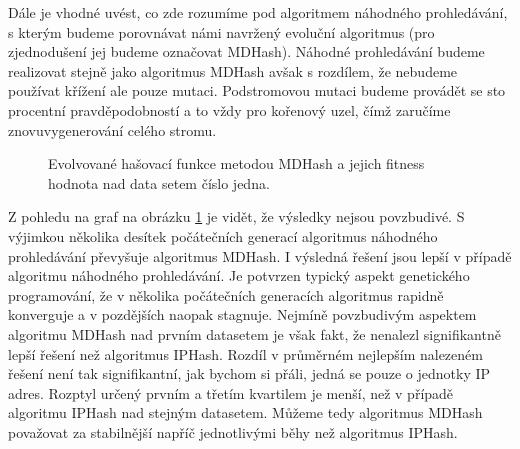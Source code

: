 Dále je vhodné uvést, co zde rozumíme pod algoritmem náhodného prohledávání, s kterým budeme porovnávat námi navržený
evoluční algoritmus (pro zjednodušení jej budeme označovat MDHash). Náhodné prohledávání budeme realizovat stejně jako
algoritmus MDHash avšak s rozdílem, že nebudeme používat křížení ale pouze mutaci. Podstromovou mutaci budeme provádět
se sto procentní pravděpodobností a to vždy pro kořenový uzel, čímž zaručíme znovuvygenerování celého stromu. 

\begin{figure}[!ht]
	\centering
	\caption{Evolvované hašovací funkce metodou MDHash a jejich fitness hodnota nad data setem číslo jedna.}
	\label{fig:MDComparison1}
\end{figure}

Z pohledu na graf na obrázku \ref{fig:MDComparison1} je vidět, že výsledky nejsou povzbudivé. S výjimkou několika desítek počátečních
generací algoritmus náhodného prohledávání
převyšuje algoritmus MDHash. I výsledná řešení jsou lepší v případě algoritmu náhodného prohledávání. Je potvrzen typický aspekt genetického
programování, že v několika počátečních generacích algoritmus rapidně konverguje a v pozdějších naopak stagnuje. Nejmíně povzbudivým aspektem
algoritmu MDHash nad prvním datasetem je však fakt, že nenalezl signifikantně lepší řešení než algoritmus IPHash. Rozdíl v průměrném nejlepším
nalezeném řešení není tak signifikantní, jak bychom si přáli, jedná se pouze o jednotky IP adres. Rozptyl určený prvním a třetím kvartilem je menší,
než v případě algoritmu IPHash nad stejným datasetem. Můžeme tedy algoritmus MDHash považovat za stabilnější napříč jednotlivými běhy než
algoritmus IPHash.

